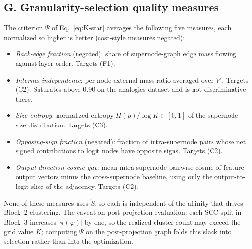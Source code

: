 \documentclass[table, 11pt]{article}
\begin{document}
\subsection*{G. Granularity-selection quality measures}\label{app:k-selection}

The criterion $\Psi$ of Eq.~\eqref{eq:K-star} averages the following
five measures, each normalized so higher is better (cost-style
measures negated):

\begin{itemize}[leftmargin=*,topsep=2pt,itemsep=1pt]
\item \emph{Back-edge fraction} (negated): share of supernode-graph
edge mass flowing against layer order. Targets (F1).
\item \emph{Internal independence}: per-node external-mass ratio
averaged over $V'$. Targets (C2). Saturates above 0.90 on the
analogies dataset and is not discriminative there.
\item \emph{Size entropy}: normalized entropy $H(p)/\log K \in [0,1]$
of the supernode-size distribution. Targets (C3).
\item \emph{Opposing-sign fraction} (negated): fraction of
intra-supernode pairs whose net signed contributions to logit nodes
have opposite signs. Targets (C2).
\item \emph{Output-direction cosine gap}: mean intra-supernode
pairwise cosine of feature output vectors minus the cross-supernode
baseline, using only the output-to-logit slice of the adjacency.
Targets (C2).
\end{itemize}

None of these measures uses $\tilde S$, so each is independent of
the affinity that drives Block~2 clustering. The caveat on
post-projection evaluation: each SCC-split in Block~3 increases
$|\pi(\varphi)|$ by one, so the realized cluster count may exceed
the grid value $K$; computing $\Psi$ on the post-projection graph
folds this slack into selection rather than into the optimization.
\end{document}
